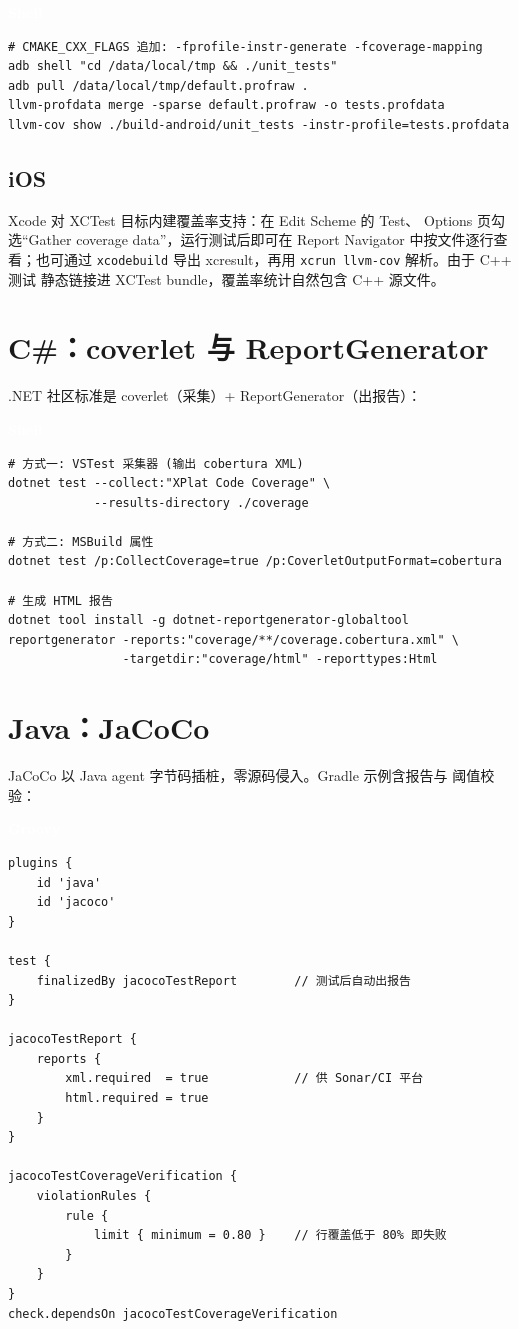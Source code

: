 \documentclass[12pt,a4paper,fontset=fandol]{ctexbook}
\newcommand{\bashlabel}{%
  \begin{tcolorbox}[enhanced,colback=black!80,colframe=black!80,
    arc=1mm,boxrule=0mm,left=6pt,right=6pt,top=2pt,bottom=2pt,
    halign=left,oversize]
    \textcolor{white}{\small\bfseries Shell}
  \end{tcolorbox}\vspace{-4pt}}
\newcommand{\groovylabel}{%
  \begin{tcolorbox}[enhanced,colback=groovyheadbg,colframe=groovyheadbg,
    arc=1mm,boxrule=0mm,left=6pt,right=6pt,top=2pt,bottom=2pt,
    halign=left,oversize]
    \textcolor{white}{\small\bfseries Groovy}
  \end{tcolorbox}\vspace{-4pt}}
\begin{document}
\bashlabel
\begin{lstlisting}
# CMAKE_CXX_FLAGS 追加: -fprofile-instr-generate -fcoverage-mapping
adb shell "cd /data/local/tmp && ./unit_tests"
adb pull /data/local/tmp/default.profraw .
llvm-profdata merge -sparse default.profraw -o tests.profdata
llvm-cov show ./build-android/unit_tests -instr-profile=tests.profdata
\end{lstlisting}

\subsection{iOS}

Xcode 对 XCTest 目标内建覆盖率支持：在 Edit Scheme 的 Test、
Options 页勾选“Gather coverage data”，运行测试后即可在
Report Navigator 中按文件逐行查看；也可通过 \texttt{xcodebuild}
导出 xcresult，再用 \texttt{xcrun llvm-cov} 解析。由于 C++ 测试
静态链接进 XCTest bundle，覆盖率统计自然包含 C++ 源文件。

\section{C\#：coverlet 与 ReportGenerator}

.NET 社区标准是 coverlet（采集）+ ReportGenerator（出报告）：

\bashlabel
\begin{lstlisting}
# 方式一: VSTest 采集器 (输出 cobertura XML)
dotnet test --collect:"XPlat Code Coverage" \
            --results-directory ./coverage

# 方式二: MSBuild 属性
dotnet test /p:CollectCoverage=true /p:CoverletOutputFormat=cobertura

# 生成 HTML 报告
dotnet tool install -g dotnet-reportgenerator-globaltool
reportgenerator -reports:"coverage/**/coverage.cobertura.xml" \
                -targetdir:"coverage/html" -reporttypes:Html
\end{lstlisting}

\section{Java：JaCoCo}

JaCoCo 以 Java agent 字节码插桩，零源码侵入。Gradle 示例含报告与
阈值校验：

\groovylabel
\begin{lstlisting}
plugins {
    id 'java'
    id 'jacoco'
}

test {
    finalizedBy jacocoTestReport        // 测试后自动出报告
}

jacocoTestReport {
    reports {
        xml.required  = true            // 供 Sonar/CI 平台
        html.required = true
    }
}

jacocoTestCoverageVerification {
    violationRules {
        rule {
            limit { minimum = 0.80 }    // 行覆盖低于 80% 即失败
        }
    }
}
check.dependsOn jacocoTestCoverageVerification
\end{lstlisting}
\end{document}
